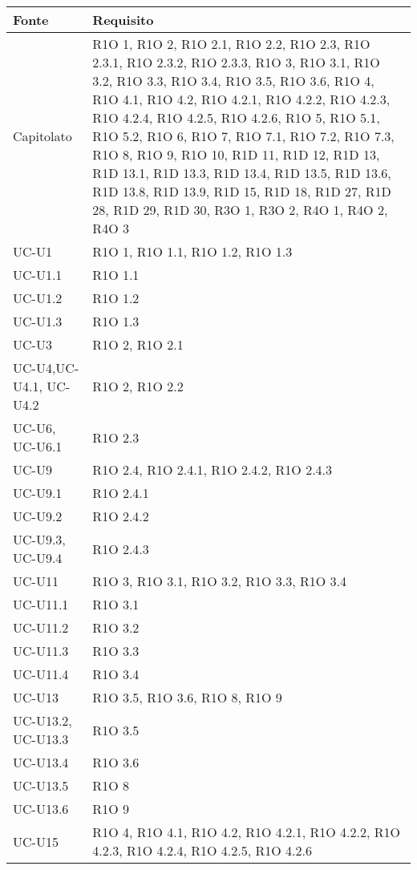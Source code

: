 \begin{center}
  \bgroup
  \def\arraystretch{1.8}
  \begin{longtable}{ |  p{5cm} | p{5cm} |}
    \hline
    \cellcolor[gray]{0.9} \textbf{Fonte} &   
    \cellcolor[gray]{0.9} \textbf{Requisito}\\ \hline
    Capitolato & R1O 1, R1O 2, R1O 2.1, R1O 2.2, R1O 2.3, R1O 2.3.1, R1O 2.3.2, R1O 2.3.3, R1O 3, R1O 3.1, R1O 3.2, R1O 3.3, R1O 3.4, R1O 3.5, R1O 3.6, R1O 4, R1O 4.1, R1O 4.2, R1O 4.2.1, R1O 4.2.2, R1O 4.2.3, R1O 4.2.4, R1O 4.2.5, R1O 4.2.6, R1O 5, R1O 5.1, R1O 5.2, R1O 6, R1O 7, R1O 7.1, R1O 7.2, R1O 7.3, R1O 8, R1O 9, R1O 10, R1D 11, R1D 12, R1D 13, R1D 13.1, R1D 13.3, R1D 13.4, R1D 13.5, R1D 13.6, R1D 13.8, R1D 13.9, R1D 15, R1D 18, R1D 27, R1D 28, R1D 29, R1D 30, R3O 1, R3O 2, R4O 1, R4O 2, R4O 3 \\ \hline
    UC-U1 & R1O 1, R1O 1.1, R1O 1.2, R1O 1.3  \\ \hline
    UC-U1.1 & R1O 1.1  \\ \hline
    UC-U1.2 & R1O 1.2  \\ \hline
    UC-U1.3 & R1O 1.3  \\ \hline
    UC-U3 & R1O 2, R1O 2.1  \\ \hline
    UC-U4,UC-U4.1, UC-U4.2 & R1O 2, R1O 2.2 \\ \hline
    UC-U6, UC-U6.1 & R1O 2.3  \\ \hline
    UC-U9 & R1O 2.4, R1O 2.4.1, R1O 2.4.2, R1O 2.4.3  \\ \hline
    UC-U9.1 & R1O 2.4.1  \\ \hline
    UC-U9.2 & R1O 2.4.2  \\ \hline
    UC-U9.3, UC-U9.4 & R1O 2.4.3  \\ \hline
    UC-U11 & R1O 3, R1O 3.1, R1O 3.2, R1O 3.3, R1O 3.4  \\ \hline
    UC-U11.1 & R1O 3.1  \\ \hline
    UC-U11.2 & R1O 3.2  \\ \hline
    UC-U11.3 & R1O 3.3  \\ \hline
    UC-U11.4 & R1O 3.4  \\ \hline
    UC-U13 & R1O 3.5, R1O 3.6, R1O 8, R1O 9  \\ \hline
    UC-U13.2, UC-U13.3 & R1O 3.5  \\ \hline
    UC-U13.4 & R1O 3.6  \\ \hline
    UC-U13.5 & R1O 8  \\ \hline
    UC-U13.6 & R1O 9  \\ \hline
    UC-U15 & R1O 4, R1O 4.1, R1O 4.2, R1O 4.2.1, R1O 4.2.2, R1O 4.2.3, R1O 4.2.4, R1O 4.2.5, R1O 4.2.6  \\ \hline

\end{longtable}
\end{center}
